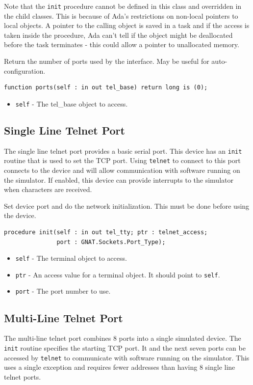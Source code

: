 \documentclass[10pt, openany]{book}
\newcommand{\function}[1]{\texttt{#1}}
\newcommand{\keyword}[1]{\texttt{#1}}
\begin{document}
Note that the \function{init} procedure cannot be defined in this class and overridden in the child classes.
This is because of Ada's restrictions on non-local pointers to local objects.
A pointer to the calling object is saved in a task and if the access is taken inside the procedure, Ada can't tell if the object might be deallocated before the task terminates - this could allow a pointer to unallocated memory.

Return the number of ports used by the interface.
May be useful for auto-configuration.
\begin{lstlisting}
function ports(self : in out tel_base) return long is (0);
\end{lstlisting}
\begin{itemize}
  \item \keyword{self} - The tel\_base object to access.
\end{itemize}

\subsection{Single Line Telnet Port}
The single line telnet port provides a  basic serial port.
This device has an \verb|init| routine that is used to set the TCP port.
Using \verb|telnet| to connect to this port connects to the device and will allow communication with software running on the simulator.
If enabled, this device can provide interrupts to the simulator when characters are received.

Set device port and do the network initialization.
This must be done before using the device.
\begin{lstlisting}
procedure init(self : in out tel_tty; ptr : telnet_access;
               port : GNAT.Sockets.Port_Type);
\end{lstlisting}
\begin{itemize}
  \item \keyword{self} - The terminal object to access.
  \item \keyword{ptr} - An access value for a terminal object.  It should point to \keyword{self}.
  \item \keyword{port} - The port number to use.
\end{itemize}

\subsection{Multi-Line Telnet Port}
The multi-line telnet port combines 8 ports into a single simulated device.
The \verb|init| routine specifies the starting TCP port.
It and the next seven ports can be accessed by \verb|telnet| to communicate with software running on the simulator.
This uses a single exception and requires fewer addresses than having 8 single line telnet ports.
\end{document}
